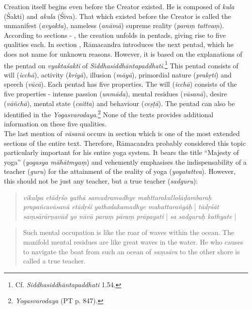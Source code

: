 Creation itself begins even before the Creator existed. He is composed of \textit{kula} (Śakti) and \textit{akula} (Śiva). That which existed before the Creator is called the unmanifest (\textit{avyakta}), nameless (\textit{anāmā}) supreme reality (\textit{paraṃ tattvaṃ}). According to sections  - , the creation unfolds in pentads, giving rise to five qualities each. In section , Rāmacandra introduces the next pentad, which he does not name for unknown reasons. However, it is based on the explanations of the pentad on \textit{vyaktaśakti} of \textit{Siddhasiddhāntapaddhati}.\footnote{Cf. \textit{Siddhasiddhāntapaddhati} 1.54.} This pentad consists of will (\textit{icchā}), activity (\textit{kriyā}), illusion (\textit{māyā}), primordial nature (\textit{prakṛti}) and speech (\textit{vācā}). Each pentad has five properties. The will (\textit{icchā}) consists of the five properties - intense passion (\textit{unmāda}), mental residues (\textit{vāsanā}), desire (\textit{vāñchā}), mental state (\textit{caitta}) and behaviour (\textit{ceṣṭā}). The pentad can also be identified in the \textit{Yogasvarodaya}.\footnote{\textit{Yogasvarodaya} (PT p. 847).} None of the texts provides additional information on these five qualities. \\

  The last mention of \textit{vāsanā} occurs in section  which is one of the most extended sections of the entire text. Therefore, Rāmacandra probably considered this topic particularly important for his entire yoga system. It bears the title ``Majesty of yoga'' (\textit{yogasya māhātmyaṃ}) and vehemently emphasises the indispensability of a teacher (\textit{guru}) for the attainment of the reality of yoga (\textit{yogatattva}). However, this should not be just any teacher, but a true teacher (\textit{sadguru}):
  \begin{quote}
    \textit{vikalpa etādṛśo yathā samudramadhye mahttarakallolāḍambaraḥ prapañcavāsanā etādṛśī yathodakamadhye mahattaraṅgāḥ} | \textit{tādṛśāt saṃsārārṇavād yo nāvā paraṃ pāraṃ prāpayati} | \textit{sa sadguruḥ kathyate} |
    \end{quote}
  \begin{quote}
   Such mental occupation is like the roar of waves within the ocean. The manifold mental residues are like great waves in the water. He who causes to navigate the boat from such an ocean of \textit{saṃsāra} to the other shore is called a true teacher.
  \end{quote}

